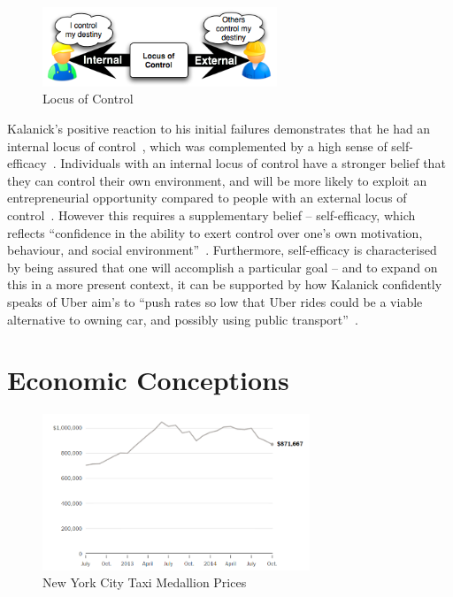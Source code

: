     \begin{figure}
      \centering
      \begin{minipage}{7cm}
        \centering
        \includegraphics[width=7cm]{inc/locus_of_control.png}
        \caption[Locus of Control ]{Locus of Control~\parencite{shead2007}}
        \label{fig:locus_of_control}
      \end{minipage}
    \end{figure}

    Kalanick's positive reaction to his initial failures demonstrates that he had an internal locus of control~\parencite{rotter1966}, which was complemented by a high sense of self-efficacy~\parencite{bandura1994}. Individuals with an internal locus of control have a stronger belief that they can control their own environment, and will be more likely to exploit an entrepreneurial opportunity compared to people with an external locus of control~\parencite{engler2009}. However this requires a supplementary belief -- self-efficacy, which reflects ``confidence in the ability to exert control over one's own motivation, behaviour, and social environment''~\parencite{carey2015}. Furthermore, self-efficacy is characterised by being assured that one will accomplish a particular goal -- and to expand on this in a more present context, it can be supported by how Kalanick confidently speaks of Uber aim's to ``push rates so low that Uber rides could be a viable alternative to owning car, and possibly using public transport''~\parencite{mishkin2015}.

  \section{Economic Conceptions}\label{sec:economic_conceptions}

    \begin{figure}
      \centering
      \begin{minipage}{8cm}
        \centering
        \includegraphics[width=8cm]{inc/new_york_city_taxi_medallion_prices.png}
        \caption[New York City Taxi Medallion Prices]{New York City Taxi Medallion Prices~\parencite{barro2014}}
        \label{fig:new_york_city_taxi_medallion_prices}
      \end{minipage}
    \end{figure}

